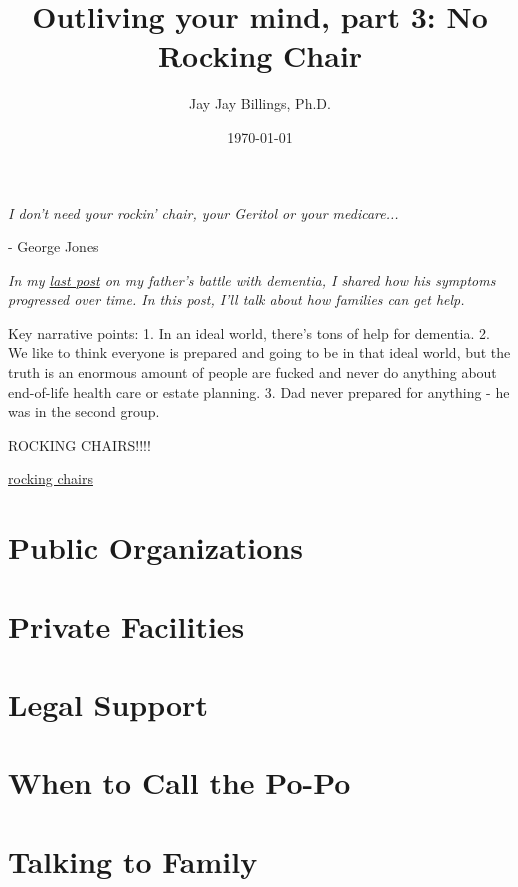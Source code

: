 \documentclass{article}
\title{Outliving your mind, part 3: No Rocking Chair}
\author{Jay Jay Billings, Ph.D.}
\date{\today}
\begin{document}
\maketitle

\begin{center}
\textit{I don't need your rockin' chair, your Geritol or your medicare...}

\hspace*{\fill} - George Jones
\end{center}

\textit{In my \href{https://jayjaybillings.com/2023/07/06/outliving-your-mind-part-1-the-secret/}{last post} on my father's battle with dementia, I shared how his symptoms progressed over time. In this post, I'll talk about how families can get help.}

Key narrative points:
1. In an ideal world, there's tons of help for dementia.
2. We like to think everyone is prepared and going to be in that ideal world, but the truth is an enormous amount of people are fucked and never do anything about end-of-life health care or estate planning.
3. Dad never prepared for anything - he was in the second group.

ROCKING CHAIRS!!!!

\href{https://jayjaybillings.com/2016/08/18/family-rocking-chairs/s}{rocking chairs}

\section*{Public Organizations}

\section*{Private Facilities}

\section*{Legal Support}

\section*{When to Call the Po-Po}

\section*{Talking to Family}
\end{document}
